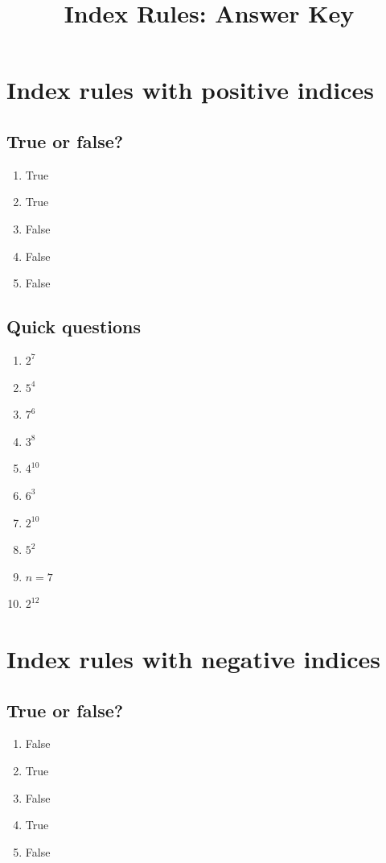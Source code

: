 \documentclass[11pt]{article}
\begin{document}
\title{Index Rules: Answer Key}
\author{}
\date{}
\maketitle

\section{Index rules with positive indices}

\subsection*{True or false?}
\begin{enumerate}[label=\arabic*.]
\item True
\item True
\item False
\item False
\item False
\end{enumerate}

\subsection*{Quick questions}
\begin{enumerate}[label=\arabic*.]
\item \(2^7\)
\item \(5^4\)
\item \(7^6\)
\item \(3^8\)
\item \(4^{10}\)
\item \(6^3\)
\item \(2^{10}\)
\item \(5^2\)
\item \(n=7\)
\item \(2^{12}\)
\end{enumerate}

\section{Index rules with negative indices}

\subsection*{True or false?}
\begin{enumerate}[label=\arabic*.]
\item False
\item True
\item False
\item True
\item False
\end{enumerate}
\end{document}

